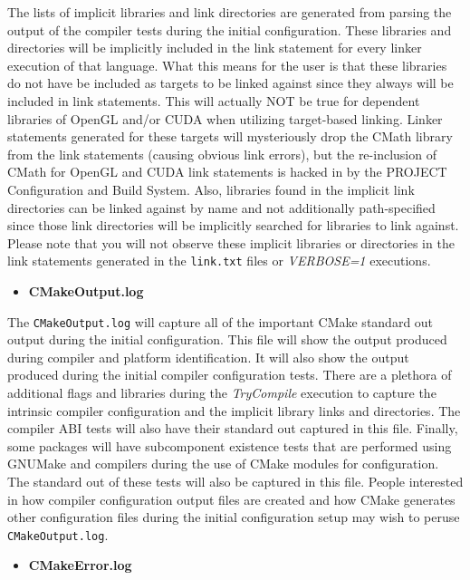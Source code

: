\documentclass[12pt,letterpaper]{article}
\begin{document}
The lists of implicit libraries and link directories are generated from parsing the output of the compiler tests during the initial configuration.  These libraries and directories will be implicitly included in the link statement for every linker execution of that language.  What this means for the user is that these libraries do not have be included as targets to be linked against since they always will be included in link statements.  This will actually NOT be true for dependent libraries of OpenGL and/or CUDA when utilizing target-based linking.  Linker statements generated for these targets will mysteriously drop the CMath library from the link statements (causing obvious link errors), but the re-inclusion of CMath for OpenGL and CUDA link statements is hacked in by the PROJECT Configuration and Build System.  Also, libraries found in the implicit link directories can be linked against by name and not additionally path-specified since those link directories will be implicitly searched for libraries to link against.  Please note that you will not observe these implicit libraries or directories in the link statements generated in the \verb|link.txt| files or \emph{VERBOSE=1} executions.

\begin{itemize}
\item \textbf{CMakeOutput.log}
\end{itemize}

The \verb|CMakeOutput.log| will capture all of the important CMake standard out output during the initial configuration.  This file will show the output produced during compiler and platform identification.  It will also show the output produced during the initial compiler configuration tests.  There are a plethora of additional flags and libraries during the \emph{TryCompile} execution to capture the intrinsic compiler configuration and the implicit library links and directories.  The compiler ABI tests will also have their standard out captured in this file.  Finally, some packages will have subcomponent existence tests that are performed using GNUMake and compilers during the use of CMake modules for configuration.  The standard out of these tests will also be captured in this file.  People interested in how compiler configuration output files are created and how CMake generates other configuration files during the initial configuration setup may wish to peruse \verb|CMakeOutput.log|.

\begin{itemize}
\item \textbf{CMakeError.log}
\end{itemize}
\end{document}
